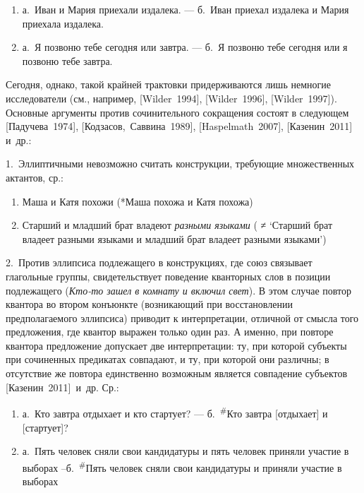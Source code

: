 \begin{enumerate}
\def\labelenumi{(\arabic{enumi})}
\setcounter{enumi}{76}
\item
  а.~Иван и Мария приехали издалека. --- б.~Иван приехал издалека и Мария
  приехала издалека.
\item
  а.~Я позвоню тебе сегодня или завтра. --- б.~Я позвоню тебе сегодня или
  я позвоню тебе завтра.
\end{enumerate}

Сегодня, однако, такой крайней трактовки придерживаются лишь немногие
исследователи (см., например, {[}Wilder~1994{]}, {[}Wilder~1996{]},
{[}Wilder~1997{]}). Основные аргументы против сочинительного сокращения
состоят в следующем {[}Падучева~1974{]}, {[}Кодзасов,~Саввина~1989{]},
{[}Haspelmath~2007{]}, {[}Казенин~2011{]} и~др.:

1.~Эллиптичными невозможно считать конструкции, требующие множественных
актантов, ср.:

\begin{enumerate}
\def\labelenumi{(\arabic{enumi})}
\setcounter{enumi}{78}
\item
  Маша и Катя похожи (*Маша похожа и Катя похожа)
\item
  Старший и младший брат владеют \textit{разными языками} ( ≠ `Старший
  брат владеет разными языками и младший брат владеет разными языками')
\end{enumerate}

2.~Против эллипсиса подлежащего в конструкциях, где союз связывает
глагольные группы, свидетельствует поведение кванторных слов в позиции
подлежащего (\textit{Кто-то зашел в комнату и включил свет}). В этом
случае повтор квантора во втором конъюнкте (возникающий при
восстановлении предполагаемого эллипсиса) приводит к интерпретации,
отличной от смысла того предложения, где квантор выражен только один
раз. А именно, при повторе квантора предложение допускает две
интерпретации: ту, при которой субъекты при сочиненных предикатах
совпадают, и ту, при которой они различны; в отсутствие же повтора
единственно возможным является совпадение субъектов
{[}Казенин~2011{]}~и~др. Ср.:

\begin{enumerate}
\def\labelenumi{(\arabic{enumi})}
\setcounter{enumi}{80}
\item
  а.~Кто завтра отдыхает и кто стартует? --- б.~\textsuperscript{\#}Кто
  завтра {[}отдыхает{]} и {[}стартует{]}?
\item
  а.~Пять человек сняли свои кандидатуры и пять человек приняли участие
  в выборах --б.~\textsuperscript{\#}Пять человек сняли свои кандидатуры
  и приняли участие в выборах
\end{enumerate}

